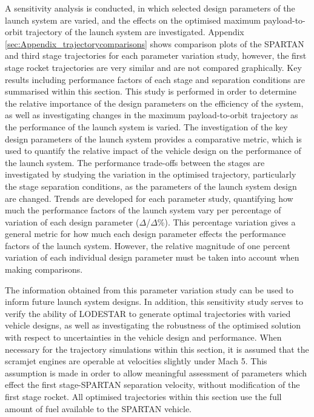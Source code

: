 A sensitivity analysis is conducted, in which selected design parameters of the launch system are varied, and the effects on the optimised maximum payload-to-orbit trajectory of the launch system are investigated. Appendix \ref{sec:Appendix_trajectorycomparisons} shows comparison plots of the SPARTAN and third stage trajectories for each parameter variation study, however, the first stage rocket trajectories are very similar and are not compared graphically. Key results including performance factors of each stage and separation conditions are summarised within this section.
This study is performed in order to determine the relative importance of the design parameters on the efficiency of the system, as well as investigating changes in the maximum payload-to-orbit trajectory as the performance of the launch system is varied. The investigation of the key design parameters of the launch system provides a comparative metric, which is used to quantify the relative impact of the vehicle design on the performance of the launch system. The performance trade-offs between the stages are investigated by studying the variation in the optimised trajectory, particularly the stage separation conditions, as the parameters of the launch system design are changed. 
Trends are developed for each parameter study, quantifying how much the performance factors of the launch system vary per percentage of variation of each design parameter ($\Delta$/$\Delta$\%). This percentage variation gives a general metric for how much each design parameter effects the performance factors of the launch system. However, the relative magnitude of one percent variation of each individual design parameter must be taken into account when making comparisons. 

The information obtained from this parameter variation study can be used to inform future launch system designs. 
In addition, this sensitivity study serves to verify the ability of LODESTAR to generate optimal trajectories with varied vehicle designs, as well as investigating the robustness of the optimised solution with respect to uncertainties in the vehicle design and performance.
When necessary for the trajectory simulations within this section, it is assumed that the scramjet engines are operable at velocities slightly under Mach 5. This assumption is made in order to allow meaningful assessment of parameters which effect the first stage-SPARTAN separation velocity, without modification of the first stage rocket.
All optimised trajectories within this section use the full amount of fuel available to the SPARTAN vehicle. 


